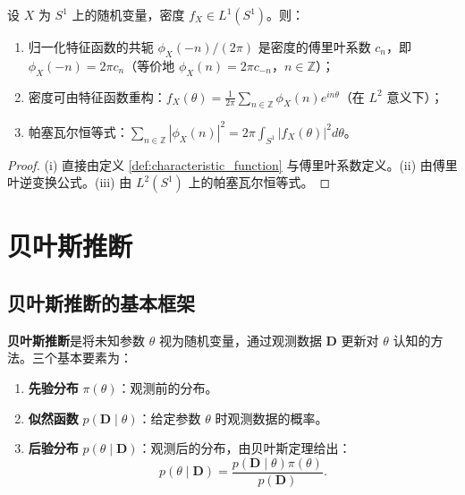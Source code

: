 \begin{proposition}[$S^1$ 上分布的特征函数与傅里叶系数]\label{prop:S1_char_fourier}
设 $X$ 为 $S^1$ 上的随机变量，密度 $f_X \in L^1(S^1)$。则：
\begin{enumerate}[label=(\roman*)]
    \item 归一化特征函数的共轭 $\phi_X(-n)/(2\pi)$ 是密度的傅里叶系数 $c_n$，即 $\phi_X(-n) = 2\pi c_n$（等价地 $\phi_X(n) = 2\pi c_{-n}$，$n \in \mathbb{Z}$）；
    \item 密度可由特征函数重构：$f_X(\theta) = \frac{1}{2\pi}\sum_{n \in \mathbb{Z}} \phi_X(n) e^{in\theta}$（在 $L^2$ 意义下）；
    \item 帕塞瓦尔恒等式：$\sum_{n \in \mathbb{Z}} |\phi_X(n)|^2 = 2\pi \int_{S^1} |f_X(\theta)|^2 d\theta$。
\end{enumerate}
\end{proposition}

\begin{proof}
(i) 直接由定义 \ref{def:characteristic_function} 与傅里叶系数定义。(ii) 由傅里叶逆变换公式。(iii) 由 $L^2(S^1)$ 上的帕塞瓦尔恒等式。
\end{proof}

\section{贝叶斯推断}\label{sec:bayesian_inference}

\subsection{贝叶斯推断的基本框架}
\label{subsec:bayes_framework}

\begin{definition}[贝叶斯推断的基本框架]\label{def:bayesian_inference}
\textbf{贝叶斯推断}是将未知参数 $\theta$ 视为随机变量，通过观测数据 $\mathbf{D}$ 更新对 $\theta$ 认知的方法。三个基本要素为：
\begin{enumerate}[label=(\roman*)]
    \item \textbf{先验分布} $\pi(\theta)$：观测前的分布。
    \item \textbf{似然函数} $p(\mathbf{D} \mid \theta)$：给定参数 $\theta$ 时观测数据的概率。
    \item \textbf{后验分布} $p(\theta \mid \mathbf{D})$：观测后的分布，由贝叶斯定理给出：
    \[
    p(\theta \mid \mathbf{D}) = \frac{p(\mathbf{D} \mid \theta) \pi(\theta)}{p(\mathbf{D})}.
    \]
\end{enumerate}
\end{definition}


